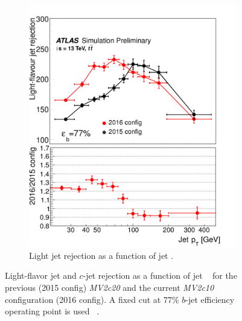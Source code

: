 \begin{figure}[htbp!]
\begin{subfigure}[b]{0.4\textwidth}
        \includegraphics[width=\textwidth]{figures/object/light_rej_pt}
        \caption{Light jet rejection as a function of jet \pt.}
        \label{fig:obj_light_rej}
    \end{subfigure}
\caption{Light-flavor jet and $c$-jet rejection as a function of jet \pt~ for the previous (2015 config) \emph{MV2c20} and the current \emph{MV2c10} configuration (2016 config). A fixed cut at 77\% $b$-jet efficiency operating point is used ~\cite{btaggingRun2}.}
\label{fig:obj_btag_rej}
\end{figure}


